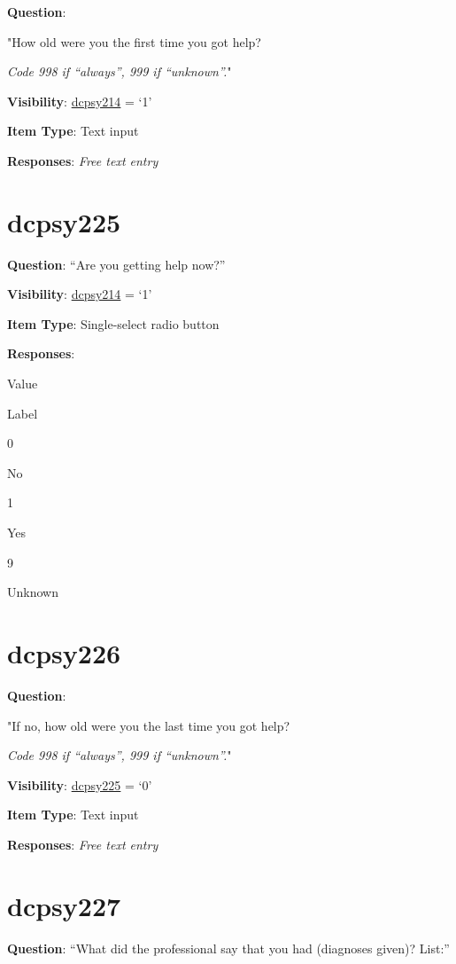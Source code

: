 \documentclass[]{book}
\begin{document}
\textbf{Question}:

"How old were you the first time you got help?

\emph{Code 998 if ``always'', 999 if ``unknown''.}"

\textbf{Visibility}: \protect\hyperlink{dcpsy214}{dcpsy214} = `1'

\textbf{Item Type}: Text input

\textbf{Responses}: \emph{Free text entry}

\hypertarget{dcpsy225}{%
\section{dcpsy225}\label{dcpsy225}}

\textbf{Question}: ``Are you getting help now?''

\textbf{Visibility}: \protect\hyperlink{dcpsy214}{dcpsy214} = `1'

\textbf{Item Type}: Single-select radio button

\textbf{Responses}:

Value

Label

0

No

1

Yes

9

Unknown

\hypertarget{dcpsy226}{%
\section{dcpsy226}\label{dcpsy226}}

\textbf{Question}:

"If no, how old were you the last time you got help?

\emph{Code 998 if ``always'', 999 if ``unknown''.}"

\textbf{Visibility}: \protect\hyperlink{dcpsy225}{dcpsy225} = `0'

\textbf{Item Type}: Text input

\textbf{Responses}: \emph{Free text entry}

\hypertarget{dcpsy227}{%
\section{dcpsy227}\label{dcpsy227}}

\textbf{Question}: ``What did the professional say that you had (diagnoses given)? List:''
\end{document}
